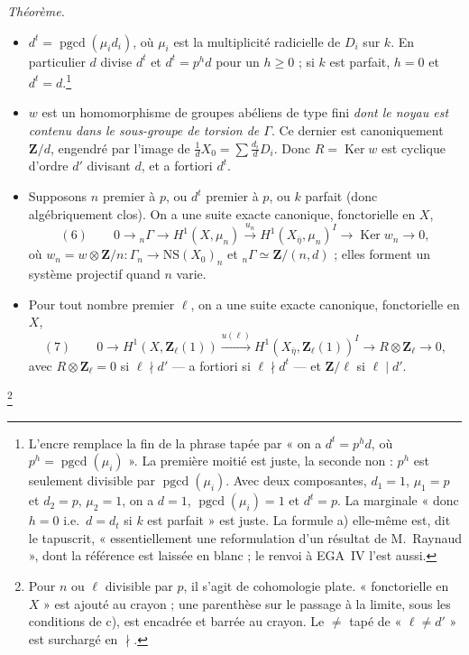 \documentclass[11pt,a4paper]{article}
\begin{document}
\emph{Théorème.}
\begin{itemize}
\item[a)] $d^t = \operatorname{pgcd}(\mu_id_i)$, où $\mu_i$ est la multiplicité
radicielle de $D_i$ sur $k$. En particulier $d$ divise $d^t$ et $d^t = p^hd$ pour
un $h \geqslant 0$ ; si $k$ est parfait, $h = 0$ et $d^t = d$.\footnote{L'encre
remplace la fin de la phrase tapée par « on a $d^t = p^hd$, où $p^h =
\operatorname{pgcd}(\mu_i)$ ». La première moitié est juste, la seconde non :
$p^h$ est seulement divisible par $\operatorname{pgcd}(\mu_i)$. Avec deux
composantes, $d_1 = 1$, $\mu_1 = p$ et $d_2 = p$, $\mu_2 = 1$, on a $d = 1$,
$\operatorname{pgcd}(\mu_i) = 1$ et $d^t = p$. La marginale « donc $h = 0$ i.e.\
$d = d_t$ si $k$ est parfait » est juste. La formule a) elle-même est, dit le
tapuscrit, « essentiellement une reformulation d'un résultat de M.~Raynaud », dont
la référence est laissée en blanc ; le renvoi à EGA~IV l'est aussi.}
\item[b)] $w$ est un homomorphisme de groupes abéliens de type fini \emph{dont le
noyau est contenu dans le sous-groupe de torsion de $\Gamma$}. Ce dernier est
canoniquement $\mathbf{Z}/d$, engendré par l'image de $\frac1d X_0 = \sum
\frac{d_i}{d}D_i$. Donc $R = \operatorname{Ker} w$ est cyclique d'ordre $d'$
divisant $d$, et a fortiori $d^t$.
\item[c)] Supposons $n$ premier à $p$, ou $d^t$ premier à $p$, ou $k$ parfait
(donc algébriquement clos). On a une suite exacte canonique, fonctorielle en $X$,
\[ (6) \qquad 0 \to {}_n\Gamma \to H^1(X, \mu_n) \xrightarrow{u_n}
H^1(X_{\bar\eta}, \mu_n)^I \to \operatorname{Ker} w_n \to 0 , \]
où $w_n = w \otimes \mathbf{Z}/n\colon \Gamma_n \to \mathrm{NS}(X_0)_n$ et
${}_n\Gamma \simeq \mathbf{Z}/(n, d)$ ; elles forment un système projectif quand
$n$ varie.
\item[d)] Pour tout nombre premier $\ell$, on a une suite exacte canonique,
fonctorielle en $X$,
\[ (7) \qquad 0 \to H^1(X, \mathbf{Z}_\ell(1)) \xrightarrow{u(\ell)}
H^1(X_{\bar\eta}, \mathbf{Z}_\ell(1))^I \to R \otimes \mathbf{Z}_\ell \to 0, \]
avec $R \otimes \mathbf{Z}_\ell = 0$ si $\ell \nmid d'$ --- a fortiori si $\ell
\nmid d^t$ --- et $\mathbf{Z}/\ell$ si $\ell \mid d'$.
\end{itemize}
\footnote{Pour $n$ ou $\ell$ divisible par $p$, il s'agit de cohomologie plate.
« fonctorielle en $X$ » est ajouté au crayon ; une parenthèse sur le passage à la
limite, sous les conditions de c), est encadrée et barrée au crayon. Le $\ne$ tapé
de « $\ell \ne d'$ » est surchargé en $\nmid$.}
\end{document}
